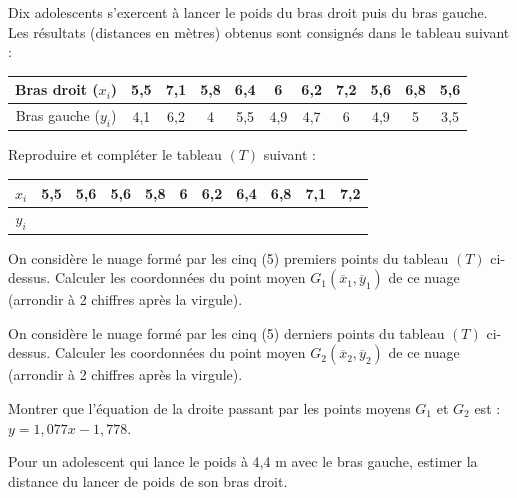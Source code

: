 \documentclass[11pt]{article}
\begin{document}
Dix adolescents s'exercent à lancer le poids du bras droit puis du bras gauche. Les résultats (distances en mètres) obtenus sont consignés dans le tableau suivant :
\begin{center}\renewcommand{\arraystretch}{1.4}
\begin{tabular}{|c|c|c|c|c|c|c|c|c|c|c|}
\hline
Bras droit ($x_i$) & 5{,}5 & 7{,}1 & 5{,}8 & 6{,}4 & 6 & 6{,}2 & 7{,}2 & 5{,}6 & 6{,}8 & 5{,}6 \\
\hline
Bras gauche ($y_i$) & 4{,}1 & 6{,}2 & 4 & 5{,}5 & 4{,}9 & 4{,}7 & 6 & 4{,}9 & 5 & 3{,}5 \\
\hline
\end{tabular}
\end{center}
\begin{questions}
  \item \begin{sousq}
    \item Reproduire et compléter le tableau $(T)$ suivant :
    \begin{center}\renewcommand{\arraystretch}{1.5}
    \begin{tabular}{|c|c|c|c|c|c|c|c|c|c|c|}
    \hline
    $x_i$ & 5{,}5 & 5{,}6 & 5{,}6 & 5{,}8 & 6 & 6{,}2 & 6{,}4 & 6{,}8 & 7{,}1 & 7{,}2 \\
    \hline
    $y_i$ & & & & & & & & & & \\
    \hline
    \end{tabular}
    \end{center}
    \item On considère le nuage formé par les cinq (5) premiers points du tableau $(T)$ ci-dessus. Calculer les coordonnées du point moyen $G_1(\overline{x}_1, \overline{y}_1)$ de ce nuage (arrondir à 2 chiffres après la virgule).
    \item On considère le nuage formé par les cinq (5) derniers points du tableau $(T)$ ci-dessus. Calculer les coordonnées du point moyen $G_2(\overline{x}_2, \overline{y}_2)$ de ce nuage (arrondir à 2 chiffres après la virgule).
  \end{sousq}
  \item \begin{sousq}
    \item Montrer que l'équation de la droite passant par les points moyens $G_1$ et $G_2$ est : $y = 1{,}077x - 1{,}778$.
    \item Pour un adolescent qui lance le poids à 4,4 m avec le bras gauche, estimer la distance du lancer de poids de son bras droit.
  \end{sousq}
\end{questions}
\end{document}
